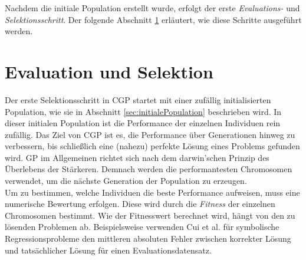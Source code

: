 Nachdem die initiale Population erstellt wurde, erfolgt der erste \emph{Evaluations-} und \emph{Selektionsschritt}. 
Der folgende Abschnitt \ref{sec:evalUndSelektion} erläutert, wie diese Schritte ausgeführt werden.


\section{Evaluation und Selektion}
\label{sec:evalUndSelektion}

Der erste Selektionsschritt in CGP startet mit einer zufällig initialisierten Population, wie sie in Abschnitt \ref{sec:initialePopulation} beschrieben wird.
In dieser initialen Population ist die Performance der einzelnen Individuen rein zufällig.
Das Ziel von CGP ist es, die Performance über Generationen hinweg zu verbessern, bis schließlich eine (nahezu) perfekte Lösung eines Problems gefunden wird.
GP im Allgemeinen richtet sich nach dem darwin'schen Prinzip des Überlebens der Stärkeren.
Demnach werden die performantesten Chromosomen verwendet, um die nächste Generation der Population zu erzeugen. \cite{koza_survey_1995}\\

Um zu bestimmen, welche Individuen die beste Performance aufweisen, muss eine numerische Bewertung erfolgen.
Diese wird durch die \emph{Fitness} der einzelnen Chromosomen bestimmt. \cite{koza_survey_1995}
Wie der Fitnesswert berechnet wird, hängt von den zu lösenden Problemen ab.
Beispielsweise verwenden Cui et al. für symbolische Regressionsprobleme den mittleren absoluten Fehler zwischen korrekter Lösung und tatsächlicher Lösung für einen Evaluationsdatensatz. \cite{affenzeller_positional_2024}\\


